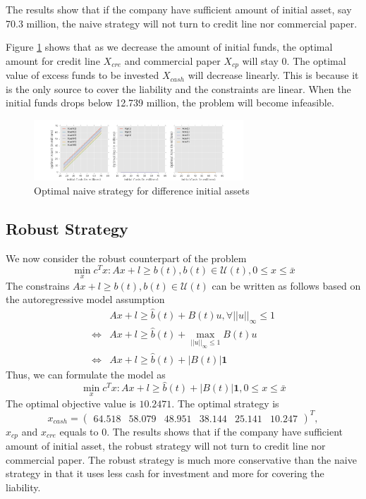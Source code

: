 \documentclass[letterpaper, 10 pt, conference]{ieeeconf}
\begin{document}
    The results show that if the company have sufficient amount of initial asset, say 70.3 million, the naive strategy will not turn to credit line nor commercial paper.

    Figure \ref{fig:naive} shows that as we decrease the amount of initial funds, the optimal amount for credit line $X_{cre}$ and commercial paper $X_{cp}$ will stay 0. The optimal value of excess funds to be invested $X_{cash}$ will decrease linearly. This is because it is the only source to cover the liability and the constraints are linear. When the initial funds drops below 12.739 million, the problem will become infeasible.
    \begin{figure}
	   \centering
	   \includegraphics[width=0.7\textwidth]{naive.png}
        \caption{Optimal naive strategy for difference initial assets}
        \label{fig:naive}
    \end{figure}  


\subsection{Robust Strategy}

    We now consider the robust counterpart of the problem
    \begin{equation}\label{eq:robust}
	   \min_x c^Tx: Ax+l\geq b(t), b(t)\in\mathcal{U}(t) ,0\leq x\leq \bar{x}
    \end{equation}
    The constrains $Ax+l\geq b(t), b(t)\in\mathcal{U}(t)$ can be written as follows based on the autoregressive model assumption
    \[\begin{split}
        & Ax+l\geq \hat{b}(t) + B(t)u, \forall ||u||_\infty \leq 1 \\
        \iff & Ax+l\geq \hat{b}(t) + \max_{||u||_\infty \leq 1}B(t)u \\
        \iff & Ax+l\geq \hat{b}(t) + |B(t)|\textbf{1}
    \end{split}\]
    Thus, we can formulate the model as
    \begin{equation}\label{eq:robust_final}
        \min_x c^Tx: Ax+l\geq \hat{b}(t) + |B(t)|\textbf{1}, 0\leq x\leq \bar{x} 
    \end{equation}
    The optimal objective value is $10.2471$. The optimal strategy is 
    \[
        x_{cash} = 
        \begin{pmatrix}
        64.518 & 58.079 & 48.951 & 38.144 & 25.141 & 10.247
        \end{pmatrix}^T,
    \]
    $x_{cp}$ and $x_{cre}$ equals to 0. The results shows that if the company have sufficient amount of initial asset, the robust strategy will not turn to credit line nor commercial paper. The robust strategy is much more conservative than the naive strategy in that it uses less cash for investment and more for covering the liability.
\end{document}
